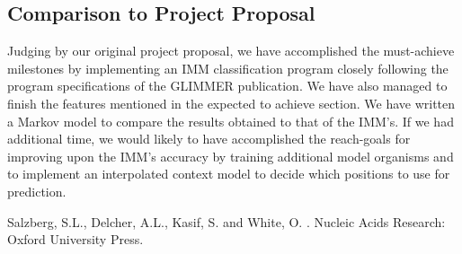 \documentclass[11pt,letterpaper]{article}
\begin{document}
\subsection{Comparison to Project Proposal}
Judging by our original project proposal, we have accomplished the must-achieve milestones by implementing an IMM classification program closely following the program specifications of the GLIMMER publication. We have also managed to finish the features mentioned in the expected to achieve section. We have written a Markov model to compare the results obtained to that of the IMM’s. If we had additional time, we would likely to have accomplished the reach-goals for improving upon the IMM’s accuracy by training additional model organisms and to implement an interpolated context model to decide which positions to use for prediction.


\begin{thebibliography}{}

Salzberg, S.L., Delcher, A.L., Kasif, S. and White, O.
.
\newblock Nucleic Acids Research: Oxford University Press.

\end{thebibliography}
\end{document}
